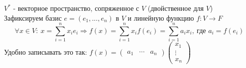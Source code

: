     \begin{definition}
        $V^{*}$ - векторное пространство, сопряженное с $V$ (двойственное для $V$)\\
        Зафиксируем базис $e = (e_1, ..., e_n)$ в $V$ и линейную функцию $f:V \rightarrow F$
        $$\forall x \in V: \ x = \sum \limits_{i=1}^n x_i e_i \Rightarrow f(x) = \sum \limits_{i=1}^n x_i f(e_i) = \sum \limits_{i=1}^n a_i x_i, \ \text{где } a_i = f(e_i)$$ 
        Удобно записывать это так: $f(x) = \begin{pmatrix}
            a_1 & \cdots & a_n
        \end{pmatrix}\begin{pmatrix} x_1 \\ \vdots \\ x_n \end{pmatrix}$
    \end{definition} 
    

